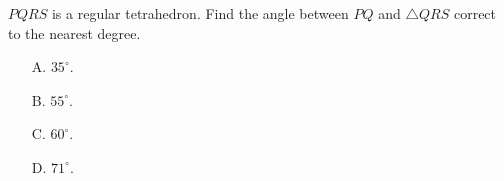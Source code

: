 
$PQRS$ is a regular tetrahedron. Find the angle between $PQ$ and $\triangle QRS$ correct to the nearest degree.
    \begin{itemize}
        \item[A.] $35^{\circ}$.
        \item[B.] $55^{\circ}$.
        \item[C.] $60^{\circ}$.
        \item[D.] $71^{\circ}$.
    \end{itemize}


